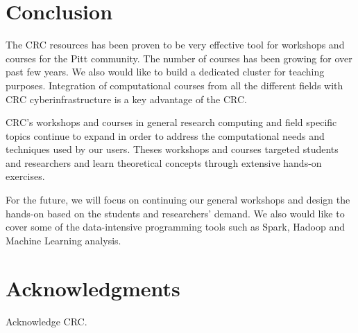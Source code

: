 \documentclass[conference]{IEEEtran}
\begin{document}
\section{Conclusion}

The CRC resources has been proven to be very effective tool for workshops and courses for the Pitt community. The number of courses has been growing for over past few years. We also would like to build a dedicated cluster for teaching purposes. Integration of computational courses from all the different fields with CRC cyberinfrastructure is a key advantage of the CRC.

CRC's workshops and courses in general research computing and field specific topics continue to expand in order to address the computational needs and techniques used by our users. Theses workshops and courses targeted students and researchers and learn theoretical concepts through extensive hands-on exercises.  

For the future, we will focus on continuing our general workshops and design the hands-on based on the students and researchers' demand. We also would like to cover some of the data-intensive programming tools such as Spark, Hadoop and Machine Learning analysis. 


\section{Acknowledgments}
Acknowledge CRC.
%

 
\end{document}
